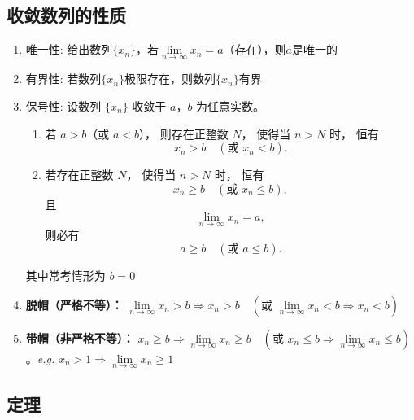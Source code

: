 \documentclass[a4paper,12pt]{article}
\begin{document}
    \subsection{收敛数列的性质}

    \begin{enumerate}
        \item 唯一性: 给出数列$\{x_n\}$，若$\lim\limits_{n\to\infty} x_n = a$（存在），则$a$是唯一的
        \item 有界性: 若数列$\{x_n\}$极限存在，则数列$\{x_n\}$有界
        \item 保号性: 设数列 $\{x_n\}$ 收敛于 $a$，$b$ 为任意实数。

        \begin{enumerate}
            \item 若 $a>b$（或 $a<b$），
            则存在正整数 $N$，
            使得当 $n>N$ 时，
            恒有
            \[
                x_n>b \quad (\text{或 } x_n<b).
            \]

            \item 若存在正整数 $N$，
            使得当 $n>N$ 时，
            恒有
            \[
                x_n\ge b \quad (\text{或 } x_n\le b),
            \]
            且
            \[
                \lim_{n\to\infty} x_n=a,
            \]
            则必有
            \[
                a\ge b \quad (\text{或 } a\le b).
            \]
        \end{enumerate}

        其中常考情形为 $b=0$
        \item \textbf{脱帽（严格不等）：} $\lim\limits_{n\to\infty} x_n > b \Rightarrow x_n > b \quad (\text{或 } \lim\limits_{n\to\infty} x_n < b \Rightarrow x_n < b)$
        \item \textbf{带帽（非严格不等）：} $x_n \geq b \Rightarrow \lim\limits_{n\to\infty} x_n \geq b \quad (\text{或 } x_n \leq b \Rightarrow \lim\limits_{n\to\infty} x_n \leq b)$。\emph{e.g.} $x_n > 1 \Rightarrow \lim\limits_{n\to \infty} x_n \geq 1$
    \end{enumerate}

    \subsection{定理}
\end{document}
